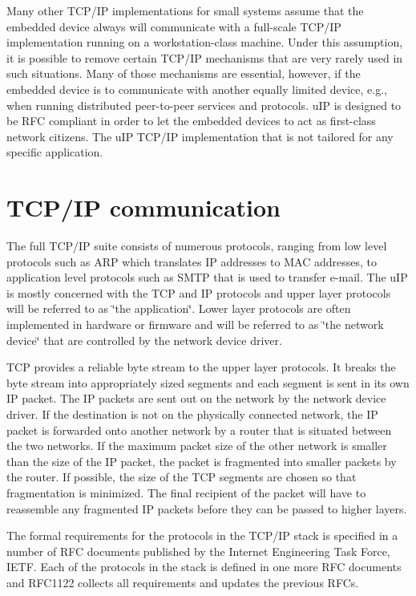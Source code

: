 Many other TCP/IP implementations for small systems assume that the embedded device always will communicate with a full-scale TCP/IP implementation running on a workstation-class machine. Under this assumption, it is possible to remove certain TCP/IP mechanisms that are very rarely used in such situations. Many of those mechanisms are essential, however, if the embedded device is to communicate with another equally limited device, e.g., when running distributed peer-to-peer services and protocols. u\-IP is designed to be RFC compliant in order to let the embedded devices to act as first-class network citizens. The u\-IP TCP/IP implementation that is not tailored for any specific application.\hypertarget{main_tcpip}{}\section{TCP/IP communication}\label{main_tcpip}
The full TCP/IP suite consists of numerous protocols, ranging from low level protocols such as ARP which translates IP addresses to MAC addresses, to application level protocols such as SMTP that is used to transfer e-mail. The u\-IP is mostly concerned with the TCP and IP protocols and upper layer protocols will be referred to as \char`\"{}the application\char`\"{}. Lower layer protocols are often implemented in hardware or firmware and will be referred to as \char`\"{}the network device\char`\"{} that are controlled by the network device driver.

TCP provides a reliable byte stream to the upper layer protocols. It breaks the byte stream into appropriately sized segments and each segment is sent in its own IP packet. The IP packets are sent out on the network by the network device driver. If the destination is not on the physically connected network, the IP packet is forwarded onto another network by a router that is situated between the two networks. If the maximum packet size of the other network is smaller than the size of the IP packet, the packet is fragmented into smaller packets by the router. If possible, the size of the TCP segments are chosen so that fragmentation is minimized. The final recipient of the packet will have to reassemble any fragmented IP packets before they can be passed to higher layers.

The formal requirements for the protocols in the TCP/IP stack is specified in a number of RFC documents published by the Internet Engineering Task Force, IETF. Each of the protocols in the stack is defined in one more RFC documents and RFC1122 collects all requirements and updates the previous RFCs.

